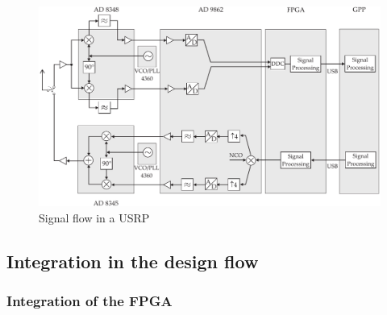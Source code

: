 \begin{landscape}
\begin{figure}
    \centering
    \includegraphics[width=1.4\textheight]{../kapitel03/figures/signal_flow_USRP.pdf}
    \begin{flushright}
    \caption{Signal flow in a USRP}
    \label{fig:signal_flow_USRP}
    \end{flushright}
\end{figure}
\end{landscape}

\subsection{Integration in the design flow}

\subsubsection{Integration of the FPGA}



